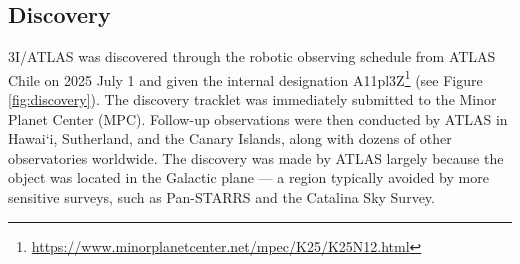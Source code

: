 \documentclass[linenumbers,twocolumn,longbib]{aastex7}
\begin{document}
\subsection{Discovery}

3I/ATLAS was discovered through the robotic observing schedule from ATLAS Chile \citep{Tonry2018a} on 2025 July 1 and given the internal designation A11pl3Z\footnote{\url{https://www.minorplanetcenter.net/mpec/K25/K25N12.html}} (see Figure \ref{fig:discovery}). The discovery tracklet was immediately submitted to the Minor Planet Center (MPC). Follow-up observations were then conducted by ATLAS in Hawai`i, Sutherland, and the Canary Islands, along with dozens of other observatories worldwide. The discovery was made by ATLAS largely because the object was located in the Galactic plane --- a region typically avoided by more sensitive surveys, such as Pan-STARRS and the Catalina Sky Survey.
\end{document}
